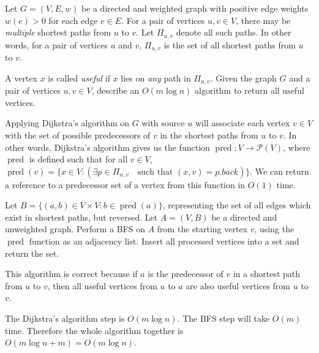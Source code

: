 \documentclass{article}
\DeclareMathOperator{\pred}{pred}
\begin{document}
\begin{question}
Let $G = (V, E, w)$ be a directed and weighted graph with positive edge weights $w(e) > 0$ for each edge $e \in E$. For a pair of vertices $u, v \in V$, there may be {\em multiple} shortest paths from $u$ to $v$. Let $\Pi_{u, v}$ denote all such paths. In other words, for a pair of vertices $u$ and $v$, $\Pi_{u, v}$ is the set of all shortest paths from $u$ to $v$.

A vertex $x$ is called {\em useful} if $x$ lies on {\em any} path in $\Pi_{u, v}$. Given the graph $G$ and a pair of vertices $u, v \in V$, describe an $O(m \log n)$ algorithm to return all useful vertices.
\end{question}

\begin{solution}
Applying Dijkstra's algorithm on $G$ with source $u$ will associate each vertex $v\in V$ with the 
set of possible predecessors of $v$ in the shortest paths from $u$ to $v$. In other words, 
Dijkstra's algorithm gives us the function $\pred:V\to \mathcal{P}(V)$, where $\pred$ is defined such that 
for all $v\in V$, $\pred(v) = \{x\in V : (\exists p\in\Pi_{u,v}\quad \text{such that } (x,v)=p.\textit{back})\}$.
We can return a reference to a predecessor set of a vertex from this function in $O(1)$ time.

Let $B=\{(a, b)\in V\times V : b\in\pred(a)\}$, representing the set of all edges which exist in shortest paths, but reversed. Let $A=(V, B)$ be a directed and unweighted graph. Perform 
a BFS on $A$ from the starting vertex $v$, using the $\pred$ function as an adjacency list.
Insert all processed vertices into a set and return the set.

This algorithm is correct because if $a$ is the predecessor of $v$ in a shortest path from $u$ to $v$, 
then all useful vertices from $u$ to $a$ are also useful vertices from $u$ to $v$.

The Dijkstra's algorithm step is $O(m\log n)$. The BFS step will take $O(m)$ time. Therefore the whole algorithm together is $O(m\log n + m) = O(m\log n)$.





\end{solution}
\end{document}
